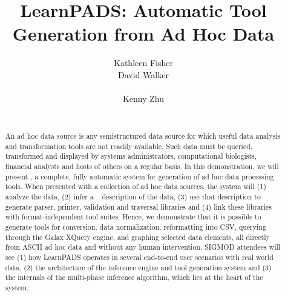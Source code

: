 \documentclass{sig-alternate-sigmod08}
\title{LearnPADS: Automatic Tool Generation from Ad Hoc Data}
\author{\alignauthor Kathleen Fisher \\
\affaddr{AT\&T Labs Research}
\email{kfisher@research.att.com}
\alignauthor David Walker \\
\affaddr{Princeton University}\\
\email{dpw@cs.princeton.edu}
\alignauthor Kenny Zhu \\
\affaddr{Princeton University}\\
\email{kzhu@cs.princeton.edu}
}
\begin{document}
\maketitle
\begin{abstract}
An ad hoc data source is any semistructured data source for which
useful data analysis and transformation tools are not readily available.
Such data must be queried, transformed and displayed by
systems administrators, computational biologists, financial analysts
and hosts of others on a regular basis.
In this demonstration, we will present \learnpads, 
a complete, fully automatic system for generation of
ad hoc data processing tools.  When presented with a collection of
ad hoc data sources, the system will (1) analyze the data, (2) infer a 
\pads{}~\cite{fisher+:pads,fisher+:popl06} description 
of the data, (3) use that description to generate parser, printer, 
validation and
traversal libraries and (4) link these libraries with format-independent
tool suites.  Hence, we demonstrate that 
it is possible to generate tools for \xml{} conversion, data
normalization, reformatting into CSV, querying through the
Galax XQuery engine, and graphing selected data elements, all
directly from ASCII ad hoc data and without any human intervention.
SIGMOD attendees will see (1) how LearnPADS operates in 
several end-to-end user scenarios with
real world data, (2) the architecture of the inference engine and
tool generation system and (3) the internals of the multi-phase 
inference algorithm, which lies at the heart of the system.


\end{abstract}
\end{document}
